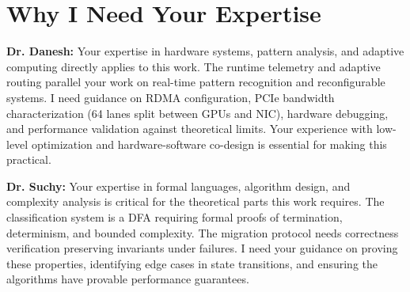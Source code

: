 \documentclass[10pt,letterpaper]{article}
\begin{document}
\section{Why I Need Your Expertise}

\textbf{Dr. Danesh:} Your expertise in hardware systems, pattern analysis, and adaptive computing directly applies to this work. The runtime telemetry and adaptive routing parallel your work on real-time pattern recognition and reconfigurable systems. I need guidance on RDMA configuration, PCIe bandwidth characterization (64 lanes split between GPUs and NIC), hardware debugging, and performance validation against theoretical limits. Your experience with low-level optimization and hardware-software co-design is essential for making this practical.

\textbf{Dr. Suchy:} Your expertise in formal languages, algorithm design, and complexity analysis is critical for the theoretical parts this work requires. The classification system is a DFA requiring formal proofs of termination, determinism, and bounded complexity. The migration protocol needs correctness verification preserving invariants under failures. I need your guidance on proving these properties, identifying edge cases in state transitions, and ensuring the algorithms have provable performance guarantees.
\end{document}
